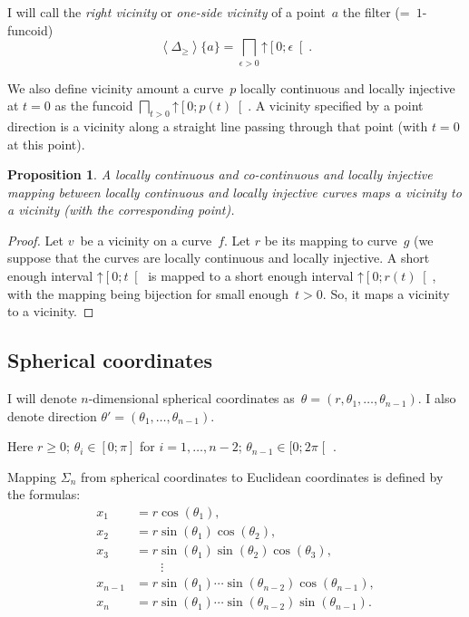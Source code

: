 \documentclass[oneside,draft]{amsart}
\newcommand{\supfun}[1]{\left\langle#1\right\rangle}
\newtheorem{prop}{Proposition}
\begin{document}
I will call the \emph{right vicinity} or \emph{one-si\-de vicinity} of a point~$a$ the filter (=~$1$-fun\-co\-id)
\[ \supfun{\Delta_{\geq}}\{a\} = \bigsqcap_{\epsilon>0}\mathord{\uparrow}\left[0;\epsilon\right[. \]

We also define vicinity amount a curve~$p$ locally continuous and locally injective at $t=0$ as the funcoid $\bigsqcap_{t>0}\mathord{\uparrow}\left[0;p(t)\right[$. A vicinity specified by a point direction is a vicinity along a straight line passing through that point (with $t=0$ at this point).

\begin{prop}
A locally continuous and co-con\-ti\-nu\-o\-us and locally injective mapping between locally continuous and locally injective curves maps a vicinity to a vicinity (with the corresponding point).
\end{prop}

\begin{proof}
Let $v$~be a vicinity on a curve~$f$. Let $r$ be its mapping to curve~$g$ (we suppose that the curves are locally continuous and locally injective. A short enough interval $\mathord{\uparrow}\left[0;t\right[$ is mapped to a short enough interval $\mathord{\uparrow}\left[0;r(t)\right[$, with the mapping being bijection for small enough~$t>0$. So, it maps a vicinity to a vicinity.
\end{proof}

\subsection{Spherical coordinates}

I will denote $n$-dimensional spherical coordinates as~$\theta=(r, \theta_1,\dots,\theta_{n-1})$.
I also denote direction $\theta'=(\theta_1,\dots,\theta_{n-1})$.

Here $r\geq 0$; $\theta_i\in[0;\pi]$ for $i=1,\dots,n-2$; $\theta_{n-1}\in[0;2\pi\mathclose[$ .

Mapping $\Sigma_n$ from spherical coordinates to Euclidean coordinates is defined by the formulas:
\[
\begin{aligned}x_{1}&=r\cos(\theta _{1}),\\x_{2}&=r\sin(\theta _{1})\cos(\theta _{2}),\\x_{3}&=r\sin(\theta _{1})\sin(\theta _{2})\cos(\theta _{3}),\\&\qquad \vdots \\x_{n-1}&=r\sin(\theta _{1})\cdots \sin(\theta _{n-2})\cos(\theta _{n-1}),\\x_{n}&=r\sin(\theta _{1})\cdots \sin(\theta _{n-2})\sin(\theta _{n-1}).\end{aligned}
\]
\end{document}
